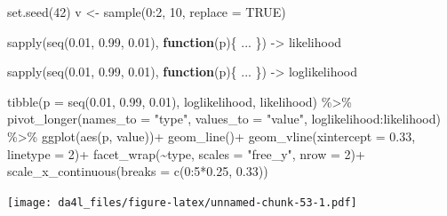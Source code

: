 \documentclass[
]{book}
\newenvironment{Shaded}{\begin{snugshade}}{\end{snugshade}}
\newcommand{\AttributeTok}[1]{\textcolor[rgb]{0.77,0.63,0.00}{#1}}
\newcommand{\ConstantTok}[1]{\textcolor[rgb]{0.00,0.00,0.00}{#1}}
\newcommand{\ControlFlowTok}[1]{\textcolor[rgb]{0.13,0.29,0.53}{\textbf{#1}}}
\newcommand{\DecValTok}[1]{\textcolor[rgb]{0.00,0.00,0.81}{#1}}
\newcommand{\FloatTok}[1]{\textcolor[rgb]{0.00,0.00,0.81}{#1}}
\newcommand{\FunctionTok}[1]{\textcolor[rgb]{0.00,0.00,0.00}{#1}}
\newcommand{\NormalTok}[1]{#1}
\newcommand{\OtherTok}[1]{\textcolor[rgb]{0.56,0.35,0.01}{#1}}
\newcommand{\SpecialCharTok}[1]{\textcolor[rgb]{0.00,0.00,0.00}{#1}}
\newcommand{\StringTok}[1]{\textcolor[rgb]{0.31,0.60,0.02}{#1}}
\begin{document}
\begin{Shaded}
\begin{Highlighting}[]
\FunctionTok{set.seed}\NormalTok{(}\DecValTok{42}\NormalTok{)}
\NormalTok{v }\OtherTok{\textless{}{-}} \FunctionTok{sample}\NormalTok{(}\DecValTok{0}\SpecialCharTok{:}\DecValTok{2}\NormalTok{, }\DecValTok{10}\NormalTok{, }\AttributeTok{replace =} \ConstantTok{TRUE}\NormalTok{)}

\FunctionTok{sapply}\NormalTok{(}\FunctionTok{seq}\NormalTok{(}\FloatTok{0.01}\NormalTok{, }\FloatTok{0.99}\NormalTok{, }\FloatTok{0.01}\NormalTok{), }\ControlFlowTok{function}\NormalTok{(p)\{}
\NormalTok{  ...}
\NormalTok{\}) }\OtherTok{{-}\textgreater{}}
\NormalTok{  likelihood}

\FunctionTok{sapply}\NormalTok{(}\FunctionTok{seq}\NormalTok{(}\FloatTok{0.01}\NormalTok{, }\FloatTok{0.99}\NormalTok{, }\FloatTok{0.01}\NormalTok{), }\ControlFlowTok{function}\NormalTok{(p)\{}
\NormalTok{  ...}
\NormalTok{\}) }\OtherTok{{-}\textgreater{}}
\NormalTok{  loglikelihood}

\FunctionTok{tibble}\NormalTok{(}\AttributeTok{p =} \FunctionTok{seq}\NormalTok{(}\FloatTok{0.01}\NormalTok{, }\FloatTok{0.99}\NormalTok{, }\FloatTok{0.01}\NormalTok{),}
\NormalTok{       loglikelihood,}
\NormalTok{       likelihood) }\SpecialCharTok{\%\textgreater{}\%} 
  \FunctionTok{pivot\_longer}\NormalTok{(}\AttributeTok{names\_to =} \StringTok{"type"}\NormalTok{, }\AttributeTok{values\_to =} \StringTok{"value"}\NormalTok{, loglikelihood}\SpecialCharTok{:}\NormalTok{likelihood) }\SpecialCharTok{\%\textgreater{}\%} 
  \FunctionTok{ggplot}\NormalTok{(}\FunctionTok{aes}\NormalTok{(p, value))}\SpecialCharTok{+}
  \FunctionTok{geom\_line}\NormalTok{()}\SpecialCharTok{+}
  \FunctionTok{geom\_vline}\NormalTok{(}\AttributeTok{xintercept =} \FloatTok{0.33}\NormalTok{, }\AttributeTok{linetype =} \DecValTok{2}\NormalTok{)}\SpecialCharTok{+}
  \FunctionTok{facet\_wrap}\NormalTok{(}\SpecialCharTok{\textasciitilde{}}\NormalTok{type, }\AttributeTok{scales =} \StringTok{"free\_y"}\NormalTok{, }\AttributeTok{nrow =} \DecValTok{2}\NormalTok{)}\SpecialCharTok{+}
  \FunctionTok{scale\_x\_continuous}\NormalTok{(}\AttributeTok{breaks =} \FunctionTok{c}\NormalTok{(}\DecValTok{0}\SpecialCharTok{:}\DecValTok{5}\SpecialCharTok{*}\FloatTok{0.25}\NormalTok{, }\FloatTok{0.33}\NormalTok{))}
\end{Highlighting}
\end{Shaded}

\texttt{[image: da4l\_files/figure-latex/unnamed-chunk-53-1.pdf]}
\end{document}
